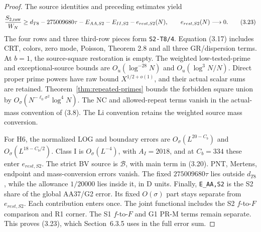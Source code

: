 \begin{proof}
The source identities and preceding estimates yield
\[
 \frac{S_{2,\rm raw}}{W_N}
 \ge d_{T8}-275009680\tau-E_{AA,S2}-E_{II,S2}-e_{rest,S2}(N),
 \qquad e_{rest,S2}(N)\longrightarrow0.
 \tag{3.23}
\]
The four rows and three third-row pieces form \texttt{S2-T8/4}.
Equation (3.17) includes CRT, colors, zero mode, Poisson, Theorem 2.8
and all three GR/dispersion terms.
At $b=1$, the source-square restoration is empty.
The weighted low-tested-prime and exceptional-source bounds are
$O_u(\log^{-28}N)$ and $O_u(\log^3N/N)$.
Direct proper prime powers have raw bound $X^{1/2+o(1)}$, and their actual scalar sums are retained.
Theorem~\ref{thm:repeated-primes} bounds the forbidden square union by
$O_\sigma(N^{-\ell_0\sigma^2}\log^4N)$.
The NC and allowed-repeat terms vanish in the actual-mass convention of (3.8).
The Li convention retains the weighted source mass conversion.

For H6, the normalized LOG and boundary errors are
$O_\sigma(L^{20-C_b})$ and $O_\sigma(L^{18-C_b/2})$.
Class I is $O_\sigma(L^{-4})$, with $A_I=2018$, and at $C_b=334$ these enter $e_{rest,S2}$.
The strict BV source is $\mathcal B$, with main term in (3.20).
PNT, Mertens, endpoint and mass-conversion errors vanish.
The fixed $275009680\tau$ lies outside $d_{T8}$, while the allowance $1/20000$ lies inside it, in D units.
Finally, \texttt{E\_AA,S2} is the S2 share of the global AA37/G2 error.
Its fixed $O(\sigma)$ part stays separate from $e_{rest,S2}$.
Each contribution enters once.
The joint functional includes the S2 $f$-to-$F$ comparison and R1 corner.
The S1 $f$-to-$F$ and G1 PR-M terms remain separate.
This proves (3.23), which Section~6.3.5 uses in the full error sum.
\end{proof}
